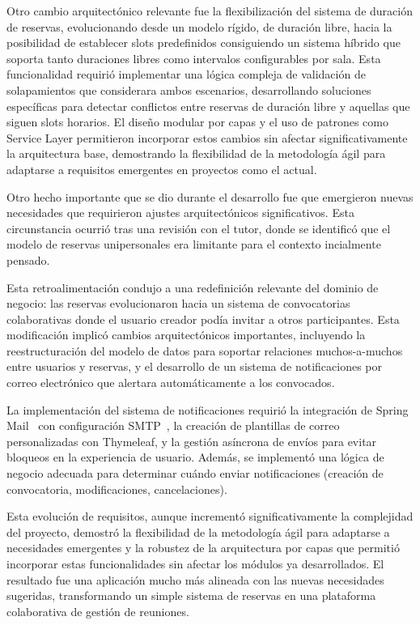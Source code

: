 Otro cambio arquitectónico relevante fue la flexibilización del sistema de duración de reservas, evolucionando desde un modelo rígido, de duración libre, hacia la posibilidad de establecer slots predefinidos consiguiendo un sistema híbrido que soporta tanto duraciones libres como intervalos configurables por sala. Esta funcionalidad requirió implementar una lógica compleja de validación de solapamientos que considerara ambos escenarios, desarrollando soluciones específicas para detectar conflictos entre reservas de duración libre y aquellas que siguen slots horarios. El diseño modular por capas y el uso de patrones como Service Layer permitieron incorporar estos cambios sin afectar significativamente la arquitectura base, demostrando la flexibilidad de la metodología ágil para adaptarse a requisitos emergentes en proyectos como el actual.

Otro hecho importante que se dio durante el desarrollo fue que emergieron nuevas necesidades que requirieron ajustes arquitectónicos significativos. Esta circunstancia ocurrió tras una revisión con el tutor, donde se identificó que el modelo de reservas unipersonales era limitante para el contexto incialmente pensado.

Esta retroalimentación condujo a una redefinición relevante del dominio de negocio: las reservas evolucionaron hacia un sistema de convocatorias colaborativas donde el usuario creador podía invitar a otros participantes. Esta modificación implicó cambios arquitectónicos importantes, incluyendo la reestructuración del modelo de datos para soportar relaciones muchos-a-muchos entre usuarios y reservas, y el desarrollo de un sistema de notificaciones por correo electrónico que alertara automáticamente a los convocados.

La implementación del sistema de notificaciones requirió la integración de Spring Mail~\cite{spring-mail} con configuración SMTP~\cite{smtp}, la creación de plantillas de correo personalizadas con Thymeleaf, y la gestión asíncrona de envíos para evitar bloqueos en la experiencia de usuario. Además, se implementó una lógica de negocio adecuada para determinar cuándo enviar notificaciones (creación de convocatoria, modificaciones, cancelaciones).

Esta evolución de requisitos, aunque incrementó significativamente la complejidad del proyecto, demostró la flexibilidad de la metodología ágil para adaptarse a necesidades emergentes y la robustez de la arquitectura por capas que permitió incorporar estas funcionalidades sin afectar los módulos ya desarrollados. El resultado fue una aplicación mucho más alineada con las nuevas necesidades sugeridas, transformando un simple sistema de reservas en una plataforma colaborativa de gestión de reuniones.

